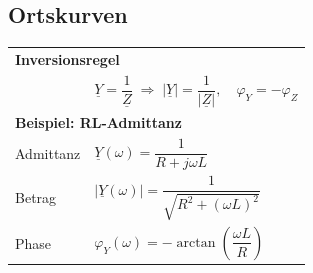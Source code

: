 \documentclass[a4paper,12pt]{scrartcl}
\begin{document}
\subsection{Ortskurven}
\begin{tabular}{@{} l l @{}}

\multicolumn{2}{l}{\textbf{Inversionsregel}} \\
& $\underline{Y} = \dfrac{1}{\underline{Z}} \;\Rightarrow\; |\underline{Y}| = \dfrac{1}{|\underline{Z}|}, \quad \varphi_Y = -\varphi_Z$ \\[3mm]

\multicolumn{2}{l}{\textbf{Beispiel: RL-Admittanz}} \\
\hspace*{20mm} Admittanz & $\underline{Y}(\omega) = \dfrac{1}{R + j\omega L}$ \\
\hspace*{20mm} Betrag & $|\underline{Y}(\omega)| = \dfrac{1}{\sqrt{R^2 + (\omega L)^2}}$ \\
\hspace*{20mm} Phase & $\varphi_Y(\omega) = -\arctan\!\left(\dfrac{\omega L}{R}\right)$ \\[3mm]


\end{tabular}
\end{document}
